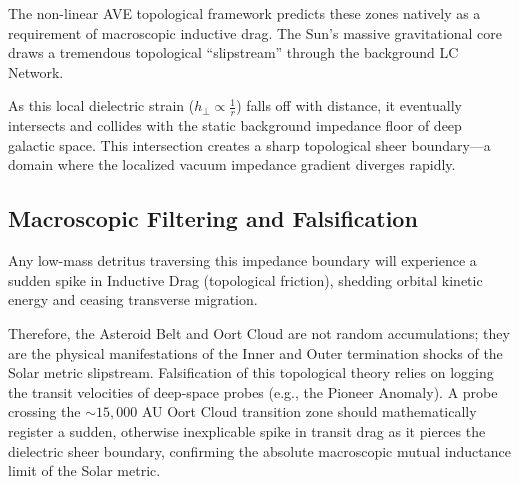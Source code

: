 The non-linear AVE topological framework predicts these zones natively as a requirement of macroscopic inductive drag. The Sun's massive gravitational core draws a tremendous topological ``slipstream'' through the background LC Network. 

As this local dielectric strain ($h_{\perp} \propto \frac{1}{r}$) falls off with distance, it eventually intersects and collides with the static background impedance floor of deep galactic space. This intersection creates a sharp topological sheer boundary—a domain where the localized vacuum impedance gradient diverges rapidly.

\subsection{Macroscopic Filtering and Falsification}
Any low-mass detritus traversing this impedance boundary will experience a sudden spike in Inductive Drag (topological friction), shedding orbital kinetic energy and ceasing transverse migration.

Therefore, the Asteroid Belt and Oort Cloud are not random accumulations; they are the physical manifestations of the Inner and Outer termination shocks of the Solar metric slipstream. 
Falsification of this topological theory relies on logging the transit velocities of deep-space probes (e.g., the Pioneer Anomaly). A probe crossing the $\sim 15,000$ AU Oort Cloud transition zone should mathematically register a sudden, otherwise inexplicable spike in transit drag as it pierces the dielectric sheer boundary, confirming the absolute macroscopic mutual inductance limit of the Solar metric.

